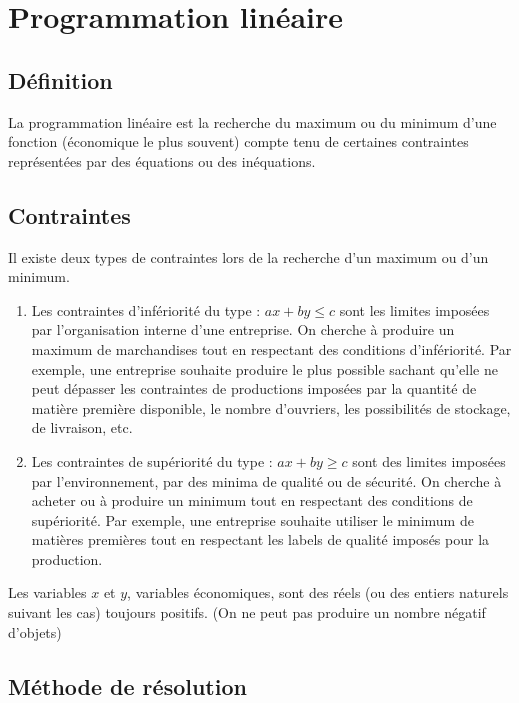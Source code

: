 \chapter{Programmation linéaire}

\section{Définition}

La programmation linéaire est la recherche du maximum ou du minimum d’une fonction (économique le plus souvent) compte tenu de certaines contraintes représentées par des équations ou des inéquations.

\section{Contraintes}

Il existe deux types de contraintes lors de la recherche d’un maximum ou d’un minimum.

\begin{enumerate}
\item Les contraintes d’infériorité du type :  $ax+by\leq c$
sont les limites imposées par l’organisation interne d’une entreprise. On cherche à produire un maximum de marchandises tout en respectant des conditions d’infériorité.
Par exemple, une entreprise souhaite produire le plus possible sachant qu’elle ne peut dépasser les contraintes de productions imposées par la quantité de matière première disponible, le nombre d’ouvriers, les possibilités de stockage, de livraison, etc. 
\item Les contraintes de supériorité du type :  $ax+by\geq c$
sont des limites imposées par l’environnement, par des minima de qualité ou de sécurité. On cherche à acheter ou à produire un minimum tout en respectant des conditions de supériorité.
Par exemple, une entreprise souhaite utiliser le minimum de matières premières tout en respectant les labels de qualité imposés pour la production.
\end{enumerate}

Les variables $x$ et $y$, variables économiques, sont des réels (ou des entiers naturels suivant les cas) toujours positifs. (On ne peut pas produire un nombre négatif d’objets)

\section{Méthode de résolution}


